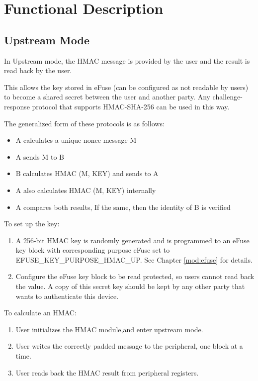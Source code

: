 \documentclass[main\_\_EN.tex]{subfiles}
\begin{document}
\section{Functional Description}

\subsection{Upstream Mode}

In Upstream mode, the HMAC message is provided by the user and the result is read back by the user.

This allows the key stored in eFuse (can be configured as not readable by users) to become a shared secret between the user and another party. Any challenge-response protocol that supports HMAC-SHA-256 can be used in this way.

The generalized form of these protocols is as follows:

\begin{itemize}
        \item A calculates a unique nonce message M
        \item A sends M to B
        \item B calculates HMAC (M, KEY) and sends to A
        \item A also calculates HMAC (M, KEY) internally
        \item A compares both results, If the same, then the identity of B is verified
\end{itemize}

To set up the key:

\begin{enumerate}
    \item A 256-bit HMAC key is randomly generated and is programmed to an eFuse key block with corresponding purpose eFuse set to EFUSE\_KEY\_PURPOSE\_HMAC\_UP. See Chapter \ref{mod:efuse} for details.
    \item Configure the eFuse key block to be read protected, so users cannot read back the value. A copy of this secret key should be kept by any other party that wants to authenticate this device.
\end{enumerate}

To calculate an HMAC:

\begin{enumerate}
    \item User initializes the HMAC module,and enter upstream mode.
    \item User writes the correctly padded message to the peripheral, one block at a time.
    \item User reads back the HMAC result from peripheral registers.
\end{enumerate}
\end{document}

